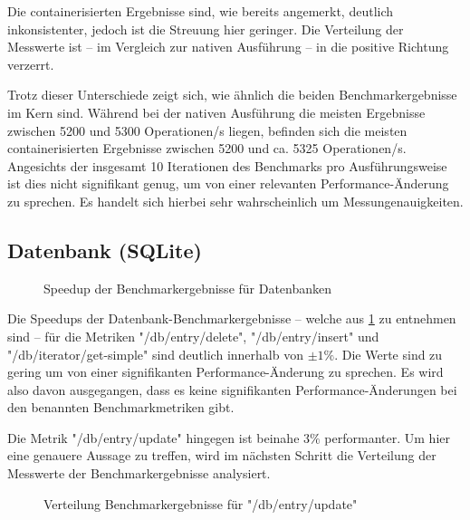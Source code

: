 Die containerisierten Ergebnisse sind, wie bereits angemerkt, deutlich inkonsistenter, jedoch ist die Streuung hier geringer. Die Verteilung der Messwerte ist – im Vergleich zur nativen Ausführung – in die positive Richtung verzerrt. 

Trotz dieser Unterschiede zeigt sich, wie ähnlich die beiden Benchmarkergebnisse im Kern sind. Während bei der nativen Ausführung die meisten Ergebnisse zwischen 5200 und 5300 Operationen/s liegen, befinden sich die meisten containerisierten Ergebnisse zwischen 5200 und ca. 5325 Operationen/s. Angesichts der insgesamt 10 Iterationen des Benchmarks pro Ausführungsweise ist dies nicht signifikant genug, um von einer relevanten Performance-Änderung zu sprechen. Es handelt sich hierbei sehr wahrscheinlich um Messungenauigkeiten. 


\subsection{Datenbank (SQLite)}

\begin{figure}[H]
    \centering
    
    \caption{Speedup der Benchmarkergebnisse für Datenbanken}
    \label{fig:speedup_db}
\end{figure}

\FloatBarrier

Die Speedups der Datenbank-Benchmarkergebnisse – welche aus \cref{fig:speedup_db} zu entnehmen sind – für die Metriken "/db/entry/delete", "/db/entry/insert" und "/db/iterator/get-simple" sind deutlich innerhalb von $\pm 1\%$. Die Werte sind zu gering um von einer signifikanten Performance-Änderung zu sprechen. Es wird also davon ausgegangen, dass es keine signifikanten Performance-Änderungen bei den benannten Benchmarkmetriken gibt.

Die Metrik "/db/entry/update" hingegen ist beinahe $3\%$ performanter. Um hier eine genauere Aussage zu treffen, wird im nächsten Schritt die Verteilung der Messwerte der Benchmarkergebnisse analysiert.

\begin{figure}[H]
    \centering
    
    \caption{Verteilung Benchmarkergebnisse für "/db/entry/update"}
    \label{fig:mdist_db_entry_update}
\end{figure}

